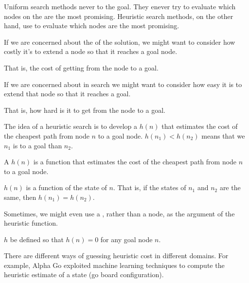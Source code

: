 Uniform search methods never  to the goal. They enever try to evaluate which nodes on the \Frontier are the most promising. Heuristic search methods, on the other hand, use  to evaluate which nodes are the most promising.

\begin{listu}
    \item If we are concerned about the  of the solution, we might want to consider how costly it's to extend a node so that it reaches a goal node. 
    
    That is, the cost of getting from the node to a goal.

    \item If we are concerned about  in search we might want to consider how easy it is to extend that node so that it reaches a goal. 
    
    That is, how hard is it to get from the node to a goal. 
\end{listu}

The idea of a heuristic search is to develop a   $h(n)$ that estimates the cost of the cheapest path from node $n$ to a goal node. $h(n_1) < h(n_2)$ means that we  $n_1$ is  to a goal than $n_2$.

\begin{definition}\label{def:heuristic-function}
    A  $h(n)$ is a function that estimates the cost of the cheapest path from node $n$ to a goal node.
\end{definition}

\begin{remark}
    $h(n)$ is a function  of the state of $n$. That is, if the states of $n_1$ and $n_2$ are the same, then $h(n_1) = h(n_2)$. 
\end{remark}

Sometimes, we might even use a , rather than a node, as the argument of the heuristic function.

\begin{remark}
    $h$  be defined so that $h(n) = 0$ for any goal node $n$.
\end{remark}

There are different ways of guessing heuristic cost in different domains. For example, Alpha Go exploited machine learning techniques to compute the heuristic estimate of a state (go board configuration).

